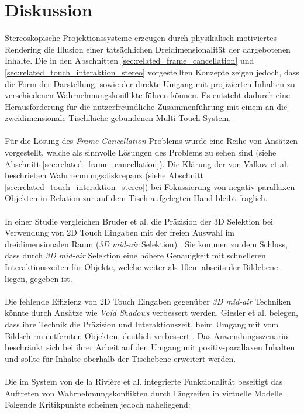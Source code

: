 \section{Diskussion}
\label{sec:diskussion_wahrnehmungskonflikte}

Stereoskopische Projektionssysteme erzeugen durch physikalisch motiviertes Rendering die Illusion einer tatsächlichen Dreidimensionalität der dargebotenen Inhalte. Die in den Abschnitten \ref{sec:related_frame_cancellation} und \ref{sec:related_touch_interaktion_stereo} vorgestellten Konzepte zeigen jedoch, dass die Form der Darstellung, sowie der direkte Umgang mit projizierten Inhalten zu verschiedenen Wahrnehmungskonflikte führen können. Es entsteht dadurch eine Herausforderung für die nutzerfreundliche Zusammenführung mit einem an die zweidimensionale Tischfläche gebundenen Multi-Touch System. 
\\\\
Für die Lösung des \emph{Frame Cancellation} Problems wurde eine Reihe von \newline Ansätzen vorgestellt, welche als sinnvolle Lösungen des Problems zu sehen sind (siehe Abschnitt \ref{sec:related_frame_cancellation}). Die Klärung der von Valkov et al. beschrieben Wahrnehmungsdiskrepanz (siehe Abschnitt \ref{sec:related_touch_interaktion_stereo}) bei Fokussierung von negativ-parallaxen Objekten in Relation zur auf dem Tisch aufgelegten Hand bleibt fraglich.
\\\\
In einer Studie vergleichen Bruder et al. die Präzision der 3D Selektion bei Verwendung von 2D Touch Eingaben mit der freien Auswahl im dreidimensionalen Raum (\emph{3D mid-air} Selektion) \cite{bruder:2013}. Sie kommen zu dem Schluss, dass durch \emph{3D mid-air} Selektion eine höhere Genauigkeit mit schnelleren Interaktionszeiten für Objekte, welche weiter als 10cm abseits der Bildebene liegen, gegeben ist.
\\\\
Die fehlende Effizienz von 2D Touch Eingaben gegenüber \emph{3D mid-air} Techniken könnte durch Ansätze wie \emph{Void Shadows} verbessert werden. Giesler et al. belegen, dass ihre Technik die Präzision und Interaktionszeit, beim Umgang mit vom Bildschirm entfernten Objekten, deutlich verbessert \linebreak \cite{giesler:2014}. Das Anwendungsszenario beschränkt sich bei ihrer Arbeit auf den Umgang mit positiv-parallaxen Inhalten und sollte für Inhalte oberhalb der Tischebene erweitert werden.
\\\\
Die im System von de la Rivière et al. integrierte Funktionalität beseitigt das Auftreten von Wahrnehmungskonflikten durch Eingreifen in virtuelle Modelle \cite{delariviere:2010}. Folgende Kritikpunkte scheinen jedoch naheliegend:


